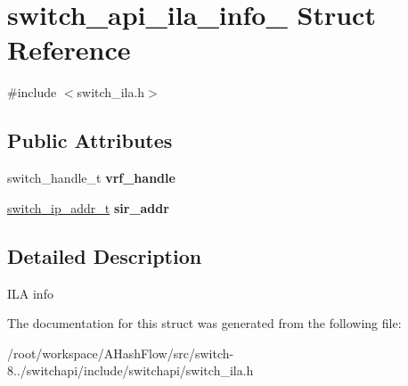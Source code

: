 \hypertarget{structswitch__api__ila__info__}{\section{switch\+\_\+api\+\_\+ila\+\_\+info\+\_\+ Struct Reference}
\label{structswitch__api__ila__info__}
}


{\ttfamily \#include $<$switch\+\_\+ila.\+h$>$}

\subsection*{Public Attributes}
\begin{DoxyCompactItemize}
\item 
\hypertarget{structswitch__api__ila__info___aea17613dc1afacb2f773207b9aa17042}{switch\+\_\+handle\+\_\+t {\bfseries vrf\+\_\+handle}}\label{structswitch__api__ila__info___aea17613dc1afacb2f773207b9aa17042}

\item 
\hypertarget{structswitch__api__ila__info___a30cd60b57b5cdcb7a2bd3b3e6b6793a7}{\hyperlink{structswitch__ip__addr__s}{switch\+\_\+ip\+\_\+addr\+\_\+t} {\bfseries sir\+\_\+addr}}\label{structswitch__api__ila__info___a30cd60b57b5cdcb7a2bd3b3e6b6793a7}

\end{DoxyCompactItemize}


\subsection{Detailed Description}
I\+L\+A info 

The documentation for this struct was generated from the following file\+:\begin{DoxyCompactItemize}
\item 
/root/workspace/\+A\+Hash\+Flow/src/switch-\/8../switchapi/include/switchapi/switch\+\_\+ila.\+h\end{DoxyCompactItemize}
